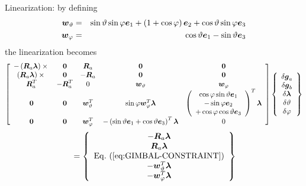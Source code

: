 \documentclass[10pt,dvips]{report}
\newcommand{\T}[1]{\boldsymbol{#1}}
\begin{document}
Linearization: by defining
\begin{eqnarray*}
	\T{w}_{\vartheta} & = & 
		\sin\vartheta \sin\varphi \T{e}_1
		+ \plbr{1 + \cos\varphi} \T{e}_2 
		+ \cos\vartheta\sin\varphi \T{e}_3 \\
	\T{w}_{\varphi} & = & 
		\cos\vartheta \T{e}_1 - \sin\vartheta \T{e}_3
\end{eqnarray*}
the linearization becomes
\begin{equation*}
	\sqbr{\matr{ccccc}{
		-\plbr{\T{R}_a \T{\lambda}}\times{} & \T{0} & \T{R}_a & \T{0} & \T{0} \\
		\plbr{\T{R}_a \T{\lambda}}\times{} & \T{0} & -\T{R}_a & \T{0} & \T{0} \\
			\T{R}_a^T & -\T{R}_a^T & 0 & \T{w}_{\vartheta} & \T{w}_{\varphi} \\
		\T{0} & \T{0} & \T{w}_{\vartheta}^T &
			\sin\varphi\T{w}_{\varphi}^T \T{\lambda} &
			\plbr{\cvvect{
				\cos\varphi\sin\vartheta\T{e}_1 \\
				- \sin\varphi\T{e}_2 \\
				+ \cos\varphi\cos\vartheta\T{e}_3
			}}^T\T{\lambda} \\
		\T{0} & \T{0} & \T{w}_{\varphi}^T &
			-\plbr{\sin\vartheta\T{e}_1 + \cos\vartheta\T{e}_3}^T \T{\lambda} & 0
	}} \cubr{\cvvect{
		\delta\T{g}_a \\
		\delta\T{g}_b \\
		\delta\T{\lambda} \\
		\delta\vartheta \\
		\delta\varphi
	}}
\end{equation*}
\begin{equation*}
	\mbox{} = \cubr{\cvvect{
		-\T{R}_a \T{\lambda} \\
		\T{R}_a \T{\lambda} \\
		\mathrm{Eq.~(\ref{eq:GIMBAL-CONSTRAINT})} \\
		-\T{w}_{\vartheta}^T \T{\lambda} \\
		-\T{w}_{\varphi}^T \T{\lambda}
	}}
\end{equation*}
\end{document}
